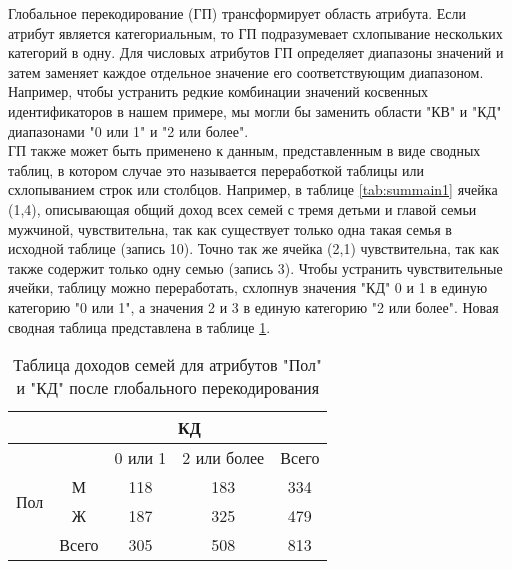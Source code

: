 Глобальное перекодирование (ГП) трансформирует область атрибута. Если атрибут является категориальным, то ГП подразумевает схлопывание нескольких категорий в одну. Для числовых атрибутов ГП определяет диапазоны значений и затем заменяет каждое отдельное значение его соответствующим диапазоном. Например, чтобы устранить редкие комбинации значений косвенных идентификаторов в нашем примере, мы могли бы заменить области "КВ" и "КД" диапазонами "0 или 1" и "2 или более".
\\

ГП также может быть применено к данным, представленным в виде сводных таблиц, в котором случае это называется переработкой таблицы или схлопыванием строк или столбцов. Например, в таблице \ref{tab:summain1} ячейка (1,4), описывающая общий доход всех семей с тремя детьми и главой семьи мужчиной, чувствительна, так как существует только одна такая семья в исходной таблице (запись 10). Точно так же ячейка (2,1) чувствительна, так как также содержит только одну семью (запись 3). Чтобы устранить чувствительные ячейки, таблицу можно переработать, схлопнув значения "КД" 0 и 1 в единую категорию "0 или 1", а значения 2 и 3 в единую категорию "2 или более". Новая сводная таблица представлена в таблице \ref{tab:GP}.
\\

\begin{table}[h]
\centering
\begin{tabular}{|c|cccc|}
\hline
                        & \multicolumn{4}{c|}{КД}                                                                \\ \hline
\multirow{4}{*}{Пол} & \multicolumn{1}{c|}{}      & \multicolumn{1}{c|}{0 или 1} & \multicolumn{1}{c|}{2 или более} & Всего \\ \cline{2-5} 
& \multicolumn{1}{c|}{М}     & \multicolumn{1}{c|}{118}     & \multicolumn{1}{c|}{183}         & 334   \\ \cline{2-5} 
                        & \multicolumn{1}{c|}{Ж}     & \multicolumn{1}{c|}{187}     & \multicolumn{1}{c|}{325}         & 479   \\ \cline{2-5} 
                        & \multicolumn{1}{c|}{Всего} & \multicolumn{1}{c|}{305}     & \multicolumn{1}{c|}{508}         & 813   \\ \hline
\end{tabular}
\caption{Таблица доходов семей для атрибутов "Пол" и "КД" после глобального перекодирования}
\label{tab:GP}
\end{table}

